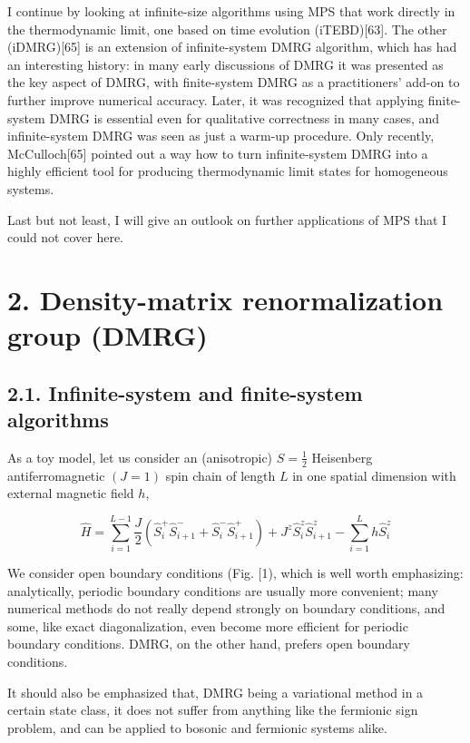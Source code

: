 \documentclass[12pt]{article}
\begin{document}
I continue by looking at infinite-size algorithms using MPS that work directly in the thermodynamic limit, one based on time evolution (iTEBD)[63]. The other (iDMRG)[65] is an extension of infinite-system DMRG algorithm, which has had an interesting history: in many early discussions of DMRG it was presented as the key aspect of DMRG, with finite-system DMRG as a practitioners' add-on to further improve numerical accuracy. Later, it was recognized that applying finite-system DMRG is essential even for qualitative correctness in many cases, and infinite-system DMRG was seen as just a warm-up procedure. Only recently, McCulloch[65] pointed out a way how to turn infinite-system DMRG into a highly efficient tool for producing thermodynamic limit states for homogeneous systems.

Last but not least, I will give an outlook on further applications of MPS that I could not cover here.

\section*{2. Density-matrix renormalization group (DMRG)}
\subsection*{2.1. Infinite-system and finite-system algorithms}
As a toy model, let us consider an (anisotropic) $S=\frac{1}{2}$ Heisenberg antiferromagnetic $(J=1)$ spin chain of length $L$ in one spatial dimension with external magnetic field $h$,


\begin{equation*}
\hat{H}=\sum_{i=1}^{L-1} \frac{J}{2}\left(\hat{S}_{i}^{+} \hat{S}_{i+1}^{-}+\hat{S}_{i}^{-} \hat{S}_{i+1}^{+}\right)+J^{z} \hat{S}_{i}^{z} \hat{S}_{i+1}^{z}-\sum_{i=1}^{L} h \hat{S}_{i}^{z} \tag{1}
\end{equation*}


We consider open boundary conditions (Fig. [1), which is well worth emphasizing: analytically, periodic boundary conditions are usually more convenient; many numerical methods do not really depend strongly on boundary conditions, and some, like exact diagonalization, even become more efficient for periodic boundary conditions. DMRG, on the other hand, prefers open boundary conditions.

It should also be emphasized that, DMRG being a variational method in a certain state class, it does not suffer from anything like the fermionic sign problem, and can be applied to bosonic and fermionic systems alike.
\end{document}
